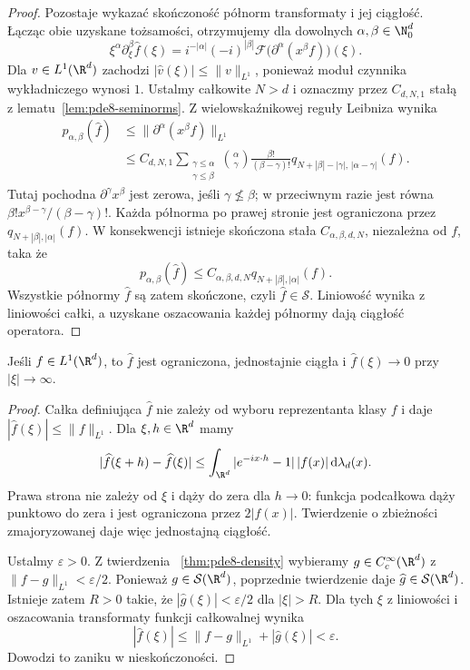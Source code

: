 \begin{proof}
Pozostaje wykazać skończoność półnorm transformaty
i jej ciągłość. Łącząc obie uzyskane tożsamości,
otrzymujemy dla dowolnych $\alpha,\beta\in\N_0^d$
\[
 \xi^\alpha\partial_\xi^\beta\widehat f(\xi)
 =i^{-|\alpha|}(-i)^{|\beta|}
 \mathcal F\bigl(\partial^\alpha(x^\beta f)\bigr)(\xi).
\]
Dla $v\in L^1(\R^d)$ zachodzi
$|\widehat v(\xi)|\le\|v\|_{L^1}$, ponieważ moduł
czynnika wykładniczego wynosi $1$.
Ustalmy całkowite $N>d$ i oznaczmy przez
$C_{d,N,1}$ stałą z lematu~\ref{lem:pde8-seminorms}.
Z wielowskaźnikowej reguły Leibniza wynika
\[
 \begin{aligned}
 p_{\alpha,\beta}(\widehat f)
 &\le \|\partial^\alpha(x^\beta f)\|_{L^1}\\
 &\le C_{d,N,1}
 \sum_{\substack{\gamma\le\alpha\\\gamma\le\beta}}
 \binom{\alpha}{\gamma}
 \frac{\beta!}{(\beta-\gamma)!}
 q_{N+|\beta|-|\gamma|,\,|\alpha-\gamma|}(f).
 \end{aligned}
\]
Tutaj pochodna $\partial^\gamma x^\beta$
jest zerowa, jeśli $\gamma\not\le\beta$;
w przeciwnym razie jest równa
$\beta!x^{\beta-\gamma}/(\beta-\gamma)!$.
Każda półnorma po prawej stronie jest
ograniczona przez $q_{N+|\beta|,|\alpha|}(f)$.
W konsekwencji istnieje skończona stała
$C_{\alpha,\beta,d,N}$, niezależna od $f$, taka że
\[
 p_{\alpha,\beta}(\widehat f)
 \le C_{\alpha,\beta,d,N}q_{N+|\beta|,|\alpha|}(f).
\]
Wszystkie półnormy $\widehat f$ są zatem skończone,
czyli $\widehat f\in\mathcal S$. Liniowość wynika
z liniowości całki, a uzyskane oszacowania
każdej półnormy dają ciągłość operatora.
\end{proof}

\begin{stwierdzenie}
\label{prop:pde8-RL}
Jeśli $f\in L^1(\R^d)$, to $\widehat f$ jest ograniczona,
jednostajnie ciągła i $\widehat f(\xi)\to0$
przy $|\xi|\to\infty$.
\end{stwierdzenie}
\begin{proof}
Całka definiująca $\widehat f$ nie zależy od wyboru
reprezentanta klasy $f$ i daje
$|\widehat f(\xi)|\le\|f\|_{L^1}$.
Dla $\xi,h\in\R^d$ mamy
\[
 |\widehat f(\xi+h)-\widehat f(\xi)|
 \le\int_{\R^d}|e^{-ix\cdot h}-1|\,|f(x)|
 \,\mathrm d\lambda_d(x).
\]
Prawa strona nie zależy od $\xi$ i dąży do zera
dla $h\to0$: funkcja podcałkowa dąży punktowo
do zera i jest ograniczona przez $2|f(x)|$.
Twierdzenie o zbieżności zmajoryzowanej daje
więc jednostajną ciągłość.

Ustalmy $\varepsilon>0$. Z twierdzenia
~\ref{thm:pde8-density} wybieramy
$g\in C_c^\infty(\R^d)$ z
$\|f-g\|_{L^1}<\varepsilon/2$.
Ponieważ $g\in\mathcal S(\R^d)$, poprzednie
twierdzenie daje $\widehat g\in\mathcal S(\R^d)$.
Istnieje zatem $R>0$ takie, że
$|\widehat g(\xi)|<\varepsilon/2$ dla $|\xi|>R$.
Dla tych $\xi$ z liniowości i oszacowania
transformaty funkcji całkowalnej wynika
\[
 |\widehat f(\xi)|
 \le\|f-g\|_{L^1}+|\widehat g(\xi)|<\varepsilon.
\]
Dowodzi to zaniku w nieskończoności.
\end{proof}

